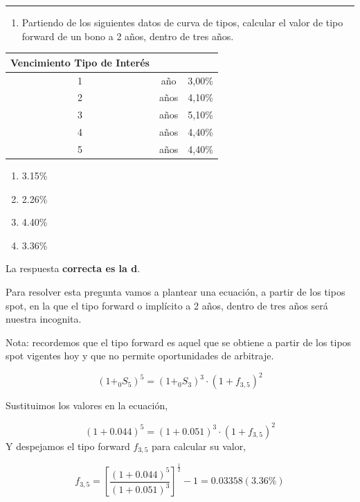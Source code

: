\documentclass[
  letterpaper,
  DIV=11,
  numbers=noendperiod]{scrreprt}
\providecommand{\tightlist}{%
  \setlength{\itemsep}{0pt}\setlength{\parskip}{0pt}}\usepackage{longtable,booktabs,array}
\begin{document}
\begin{center}\rule{0.5\linewidth}{0.5pt}\end{center}

\begin{enumerate}
\def\labelenumi{\arabic{enumi}.}
\setcounter{enumi}{89}
\tightlist
\item
  Partiendo de los siguientes datos de curva de tipos, calcular el valor
  de tipo forward de un bono a 2 años, dentro de tres años.
\end{enumerate}

\begin{longtable}[]{@{}ccc@{}}
\toprule()
Vencimiento Tipo de Interés & & \\
\midrule()
\endhead
1 & año & 3,00\% \\
2 & años & 4,10\% \\
3 & años & 5,10\% \\
4 & años & 4,40\% \\
5 & años & 4,40\% \\
\bottomrule()
\end{longtable}

\begin{enumerate}
\def\labelenumi{\alph{enumi})}
\item
  3.15\%
\item
  2.26\%
\item
  4.40\%
\item
  3.36\%
\end{enumerate}

\begin{tcolorbox}[enhanced jigsaw, left=2mm, opacityback=0, colback=white, breakable, arc=.35mm, bottomrule=.15mm, rightrule=.15mm, toprule=.15mm, leftrule=.75mm, colframe=quarto-callout-tip-color-frame]
\begin{minipage}[t]{5.5mm}
\textcolor{quarto-callout-tip-color}{\faLightbulb}
\end{minipage}%
\begin{minipage}[t]{\textwidth - 5.5mm}

La respuesta \textbf{correcta es la d}.

Para resolver esta pregunta vamos a plantear una ecuación, a partir de
los tipos spot, en la que el tipo forward o implícito a 2 años, dentro
de tres años será nuestra incognita.

Nota: recordemos que el tipo forward es aquel que se obtiene a partir de
los tipos spot vigentes hoy y que no permite oportunidades de arbitraje.

\[\left(1+_0S_5\right)^5=\left(1+_{0}S_3\right)^3\cdot\left(1+f_{3,5}\right)^2\]

Sustituimos los valores en la ecuación,

\[\left(1+0.044\right)^5=\left(1+0.051\right)^3\cdot\left(1+f_{3,5}\right)^2\]
Y despejamos el tipo forward \(f_{3,5}\) para calcular su valor,

\[f_{3,5}=\left[\frac{\left(1+0.044\right)^ 5}{ \left(1+0.051\right)^3}\right]^{\frac{1 }{2 }}-1=0.03358(3.36\%)\]

\end{minipage}%
\end{tcolorbox}
\end{document}
